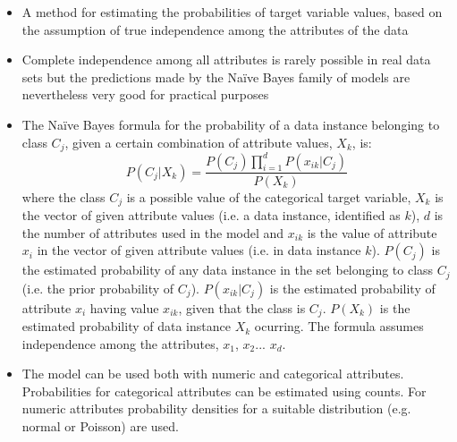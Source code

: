 \begin{itemize}
\item A method for estimating the probabilities of target variable values, based on the assumption of true independence among the attributes of the data
\item Complete independence among all attributes is rarely possible in real data sets but the predictions made by the Na\"ive Bayes family of models are nevertheless very good for practical purposes
\item The Na\"ive Bayes formula for the probability of a data instance belonging to class $C_j$, given a certain combination of attribute values, $X_k$, is:
  $$ P(C_j|X_k) = \dfrac{P(C_j)\prod_{i=1}^d P(x_{ik}|C_j)}{P(X_k)} $$
where the class $C_j$ is a possible value of the categorical target variable, $X_k$ is the vector of given attribute values (i.e. a data instance, identified as $k$), $d$ is the number of attributes used in the model and $x_{ik}$ is the value of attribute $x_i$ in the vector of given attribute values (i.e. in data instance $k$). $P(C_j)$ is the estimated probability of any data instance in the set belonging to class $C_j$ (i.e. the prior probability of $C_j$). $P(x_{ik}|C_j)$ is the estimated probability of attribute $x_i$ having value $x_{ik}$, given that the class is $C_j$. $P(X_k)$ is the estimated probability of data instance $X_k$ ocurring. The formula assumes independence among the attributes, $x_1$, $x_2$... $x_d$.  
\item The model can be used both with numeric and categorical attributes. Probabilities for categorical attributes can be estimated using counts. For numeric attributes probability densities for a suitable distribution (e.g. normal or Poisson) are used.  
\end{itemize}
\newpage

